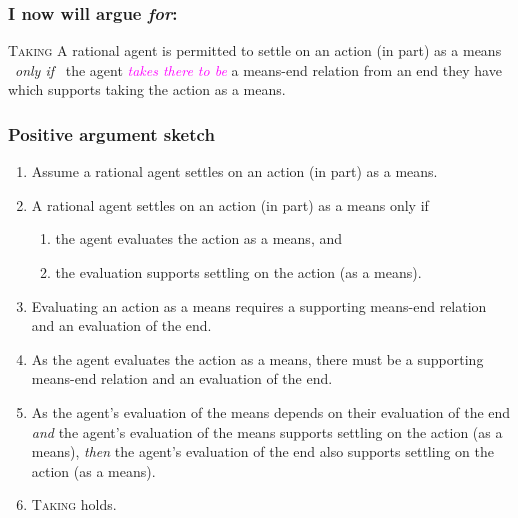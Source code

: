 \documentclass[noamssymb,
graphics,
]{beamer} %
\newcommand{\schemaName}[1]{\textsc{#1}}
\begin{document}
\begin{frame}
  \frametitle{I now will argue \emph{for}:}

  \begin{block}{\schemaName{Taking}}
    A rational agent is permitted to settle on an action (in part) as a means
    \newline
    \mbox{ }\hfill\emph{only if}\hfill\mbox{ }
    \newline
    the agent \textcolor{fuchsia}{\emph{takes there to be}} a means-end relation from an end they have which supports taking the action as a means.
  \end{block}
\end{frame}

\begin{frame}
  \frametitle{Positive argument sketch}
  \begin{enumerate}
  \item Assume a rational agent settles on an action (in part) as a means.
  \item A rational agent settles on an action (in part) as a means only if
    \begin{enumerate}
    \item the agent evaluates the action as a means, and
    \item the evaluation supports settling on the action (as a means).
    \end{enumerate}
  \item Evaluating an action as a means requires a supporting means-end relation and an evaluation of the end.
  \item As the agent evaluates the action as a means, there must be a supporting means-end relation and an evaluation of the end.
  \item As the agent's evaluation of the means depends on their evaluation of the end \emph{and} the agent's evaluation of the means supports settling on the action (as a means), \emph{then} the agent's evaluation of the end also supports settling on the action (as a means).
  \item \schemaName{Taking} holds.
  \end{enumerate}
\end{frame}
\end{document}
